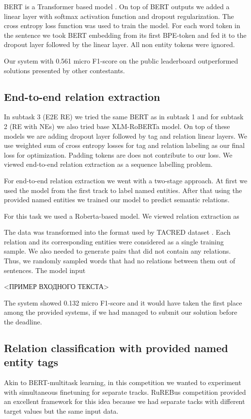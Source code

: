 \documentclass{dialogue}
\begin{document}
BERT is a Transformer based model \cite{attention}. On top of BERT outputs we added a linear layer with softmax activation function and dropout regularization. The cross entropy loss function was used to train the model. For each word token in the sentence we took BERT embedding from its first BPE-token and fed it to the dropout layer followed by the linear layer. All non entity tokens were ignored.

Our system with 0.561 micro F1-score on the public leaderboard outperformed solutions presented by other contestants.
\subsection{End-to-end relation extraction}
In subtask 3 (E2E RE) we tried the same BERT as in subtask 1 and for subtask 2 (RE with NEs) we also tried base XLM-RoBERTa model. On top of these models we are adding dropout layer followed by tag and relation linear layers. We use weighted sum of cross entropy losses for tag and relation labeling as our final loss for optimization. Padding tokens are does not contribute to our loss.
We viewed end-to-end relation extraction as a sequence labelling problem.

For end-to-end relation extraction we went with a two-stage approach. At first we used the model from the first track to label named entities. After that using the provided named entities we trained our model to predict semantic relations.

For this task we used a Roberta-based model. We viewed relation extraction as 

The data was transformed into the format used by TACRED dataset \cite{tacred}. Each relation and its corresponding entities were considered as a single training sample. We also needed to generate pairs that did not contain any relations. Thus, we randomly sampled words that had no relations between them out of sentences. The model input

<ПРИМЕР ВХОДНОГО ТЕКСТА>


The system showed 0.132 micro F1-score and it would have taken the first place among the provided systems, if we had managed to submit our solution before the deadline.

\subsection{Relation classification with provided named entity tags}
Akin to BERT-multitask learning, in this competition we wanted to experiment with simultaneous finetuning for separate tracks. RuREBus competition provided an excellent framework for this idea because we had separate tacks with different target values but the same input data.
\end{document}
